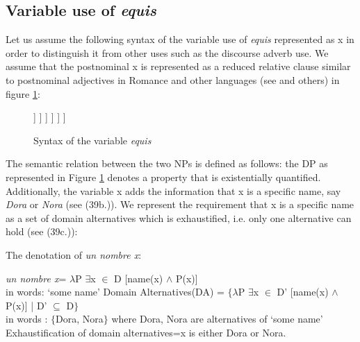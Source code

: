 \documentclass[output=paper
,modfonts
,nonflat]{langsci/langscibook}
\begin{document}
\subsection{Variable use of \textit{equis}}\label{sec:kellert:3.2}
Let us assume the following syntax of the variable use of \textit{equis} represented as x in order to distinguish it from other uses such as the discourse adverb use. We assume that the postnominal x is represented as a reduced relative clause similar to postnominal adjectives in Romance and other languages (see \citealt{Cinque:2010} and others) in figure \ref{fig:kellert:tree1n}:


\begin{figure}
	\begin{forest}
		[DP
			[D\\\textit{un}\\`a'] [NP
				[NP\\\textit{nombre}\\`name'] [CP
					[C\\(\textit{que})\\`that'] [TP
						[T\\(\textit{es})\\`is'] [VP
							[~] [NP [$X$,roof]]
						]
					]
				]
			]
		]
	\end{forest}
	\caption{Syntax of the variable \textit{equis}\label{fig:kellert:tree1n}}

\end{figure}

The semantic relation between the two NPs is defined as follows: the DP as represented in Figure \ref{fig:kellert:tree1n} denotes a property that is existentially quantified. Additionally, the variable x adds the information that x is a specific name, say \textit{Dora} or \textit{Nora} (see (39b.)). We represent the requirement that x is a specific name as a set of domain alternatives which is exhaustified, i.e. only one alternative can hold (see (39c.)):

\ea The denotation of \textit{un nombre x}:
\begin{xlist}
\ex
{\textlbrackdbl \textit{un nombre x}\textrbrackdbl = $\lambda$P $\exists$x $\in$ D [name(x) $\wedge$ P(x)]}\\
in words: ‘some name’
\ex
{Domain Alternatives(DA) = $\lbrace$$\lambda$P $\exists$x $\in$ D’ [name(x) $\wedge$ P(x)] | D’ $\subseteq$ D$\rbrace$}\\
in words : $\lbrace$Dora, Nora$\rbrace$ where Dora, Nora are alternatives of ‘some name’
\ex
Exhaustification of domain alternatives=x is either Dora or Nora.
\end{xlist}
\z
\end{document}
